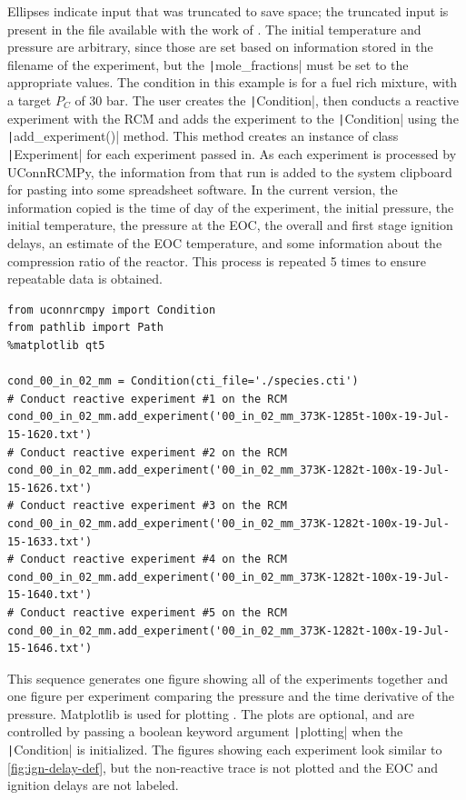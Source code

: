 \documentclass[12pt]{../ussci}
\begin{document}
Ellipses indicate input that was truncated to save space; the truncated
input is present in the file available with the work of \textcite{Dames2016}. The
initial temperature and pressure are arbitrary, since those are set
based on information stored in the filename of the experiment, but the
\texttt|mole_fractions| must be set to the appropriate values. The
condition in this example is for a fuel rich mixture, with a target
\(P_C\) of 30 bar. The user creates the \texttt|Condition|, then
conducts a reactive experiment with the RCM and adds the experiment to
the \texttt|Condition| using the \texttt|add_experiment()| method. This
method creates an instance of class \texttt|Experiment| for each
experiment passed in. As each experiment is processed by UConnRCMPy, the
information from that run is added to the system clipboard for pasting
into some spreadsheet software. In the current version, the information
copied is the time of day of the experiment, the initial pressure, the
initial temperature, the pressure at the EOC, the overall and first
stage ignition delays, an estimate of the EOC temperature, and some
information about the compression ratio of the reactor. This process is
repeated 5 times to ensure repeatable data is obtained.

\begin{verbatim}
from uconnrcmpy import Condition
from pathlib import Path
%matplotlib qt5

cond_00_in_02_mm = Condition(cti_file='./species.cti')
# Conduct reactive experiment #1 on the RCM
cond_00_in_02_mm.add_experiment('00_in_02_mm_373K-1285t-100x-19-Jul-15-1620.txt')
# Conduct reactive experiment #2 on the RCM
cond_00_in_02_mm.add_experiment('00_in_02_mm_373K-1282t-100x-19-Jul-15-1626.txt')
# Conduct reactive experiment #3 on the RCM
cond_00_in_02_mm.add_experiment('00_in_02_mm_373K-1282t-100x-19-Jul-15-1633.txt')
# Conduct reactive experiment #4 on the RCM
cond_00_in_02_mm.add_experiment('00_in_02_mm_373K-1282t-100x-19-Jul-15-1640.txt')
# Conduct reactive experiment #5 on the RCM
cond_00_in_02_mm.add_experiment('00_in_02_mm_373K-1282t-100x-19-Jul-15-1646.txt')
\end{verbatim}

This sequence generates one figure showing all of the experiments
together and one figure per experiment comparing the pressure and the
time derivative of the pressure. Matplotlib is used for plotting
\autocite{Hunter2007}. The plots are optional, and are controlled by
passing a boolean keyword argument \texttt|plotting| when the
\texttt|Condition| is initialized. The figures showing each experiment
look similar to \cref{fig:ign-delay-def}, but the non-reactive
trace is not plotted and the EOC and ignition delays are not labeled.
\end{document}
